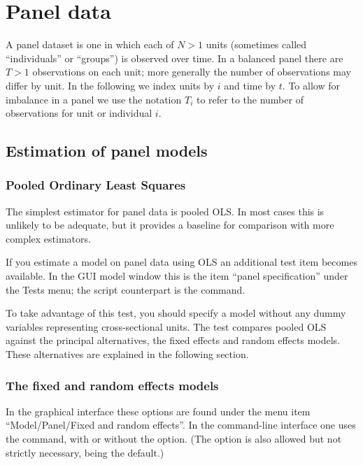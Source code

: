 \chapter{Panel data}
\label{chap:panel}

A panel dataset is one in which each of $N>1$ units (sometimes called
``individuals'' or ``groups'') is observed over time. In a balanced
panel there are $T>1$ observations on each unit; more generally the
number of observations may differ by unit. In the following we index
units by $i$ and time by $t$. To allow for imbalance in a panel we use
the notation $T_i$ to refer to the number of observations for unit
or individual $i$.

\section{Estimation of panel models}

\subsection{Pooled Ordinary Least Squares}
\label{pooled-est}

The simplest estimator for panel data is pooled OLS.  In most cases
this is unlikely to be adequate, but it provides a baseline for
comparison with more complex estimators.

If you estimate a model on panel data using OLS an additional test
item becomes available.  In the GUI model window this is the item
``panel specification'' under the \textsf{Tests} menu; the script
counterpart is the  command.

To take advantage of this test, you should specify a model without any
dummy variables representing cross-sectional units.  The test compares
pooled OLS against the principal alternatives, the fixed effects and
random effects models.  These alternatives are explained in the
following section.

\subsection{The fixed and random effects models}
\label{sec:FE-vs-RE}

In the graphical interface these options are found under the menu item
``Model/Panel/Fixed and random effects''.  In the command-line
interface one uses the  command, with or without the
 option. (The  option is 
also allowed but not strictly necessary, being the default.)

